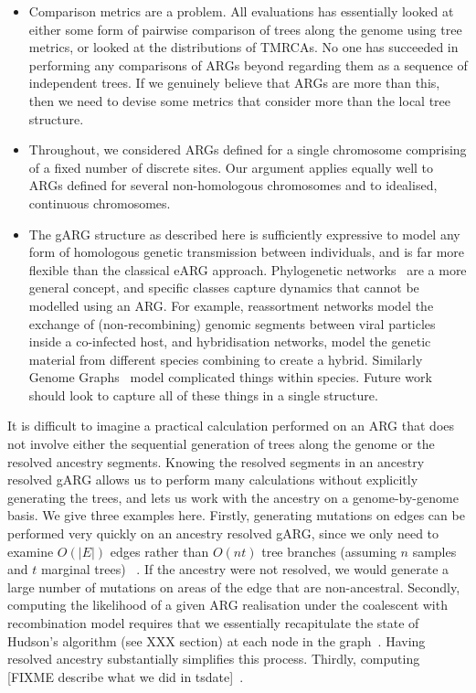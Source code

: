 \documentclass{article}
\begin{document}
\begin{itemize}
\item Comparison metrics are a problem. All evaluations has essentially
looked at either some form of pairwise comparison of trees along the genome
using tree metrics, or looked at the distributions of TMRCAs. No
one has succeeded in performing any comparisons of ARGs beyond
regarding them as a sequence of independent trees. If we genuinely believe
that ARGs are more than this, then we need to devise some metrics that
consider more than the local tree structure.

\item Throughout, we considered ARGs defined for a single chromosome comprising
of a fixed number of discrete sites. Our argument applies equally well to ARGs
defined for several non-homologous chromosomes \citep{fearnhead2003ancestral,
koskela2019robust} and to idealised, continuous chromosomes.

\item The gARG structure as described here is sufficiently expressive
to model any form of homologous genetic transmission between individuals,
and is far more flexible than the classical eARG approach.
Phylogenetic networks~\citep{huson2010phylogenetic} are a more
general concept, and specific classes capture dynamics that
cannot be modelled using an ARG. For example,
reassortment networks model the exchange of
(non-recombining) genomic segments between viral particles inside a co-infected host,
and hybridisation networks, model the genetic material from
different species combining to create a hybrid.
Similarly Genome Graphs~\cite{novak2017genome} model complicated things
within species. Future work should look to capture all of these things
in a single structure.

\end{itemize}


It is difficult to imagine a practical calculation performed on an
ARG that does not involve either the sequential generation of trees
along the genome or the resolved ancestry segments.
Knowing the resolved segments in an ancestry resolved gARG allows
us to perform many calculations without explicitly generating
the trees, and lets us work with the ancestry on a genome-by-genome
basis. We give three examples here. Firstly, generating mutations
on edges can be performed very quickly on an ancestry resolved
gARG, since we only need to examine $O(|E|)$ edges rather than
$O(nt)$ tree branches (assuming $n$ samples and $t$ marginal trees)
~\citep{baumdicker2021efficient}. If the ancestry were not resolved,
we would generate a large number of mutations on areas of the edge that
are non-ancestral. Secondly, computing the likelihood of a given
ARG realisation under the coalescent with recombination model
requires that we essentially recapitulate the state of Hudson's
algorithm (see XXX section) at each node in
the graph~\citep{baumdicker2021efficient}. Having resolved ancestry
substantially simplifies this process. Thirdly, computing
[FIXME describe what we did in tsdate]~\citep{wohns2022unified}.
\end{document}
